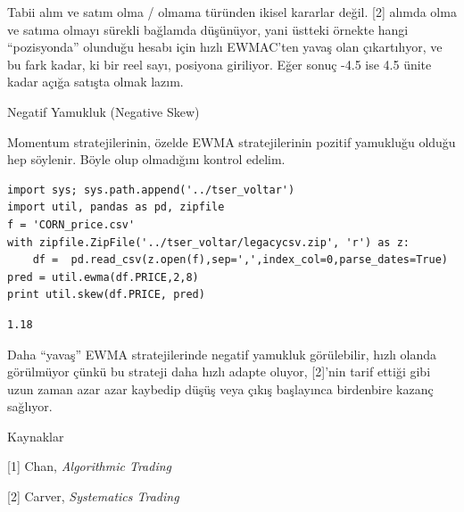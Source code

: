 \documentclass[12pt,fleqn]{article}\usepackage{../../common}
\begin{document}
Tabii alım ve satım olma / olmama türünden ikisel kararlar değil. [2] alımda
olma ve satıma olmayı sürekli bağlamda düşünüyor, yani üstteki örnekte hangi
``pozisyonda'' olunduğu hesabı için hızlı EWMAC'ten yavaş olan çıkartılıyor, ve
bu fark kadar, ki bir reel sayı, posiyona giriliyor. Eğer sonuç -4.5 ise 4.5
ünite kadar açığa satışta olmak lazım. 

Negatif Yamukluk (Negative Skew)

Momentum stratejilerinin, özelde EWMA stratejilerinin pozitif yamukluğu olduğu
hep söylenir. Böyle olup olmadığını kontrol edelim.

\begin{verbatim}
import sys; sys.path.append('../tser_voltar')
import util, pandas as pd, zipfile
f = 'CORN_price.csv'
with zipfile.ZipFile('../tser_voltar/legacycsv.zip', 'r') as z:
    df =  pd.read_csv(z.open(f),sep=',',index_col=0,parse_dates=True)
pred = util.ewma(df.PRICE,2,8)
print util.skew(df.PRICE, pred)
\end{verbatim}

\begin{verbatim}
1.18
\end{verbatim}

Daha ``yavaş'' EWMA stratejilerinde negatif yamukluk görülebilir, hızlı olanda
görülmüyor çünkü bu strateji daha hızlı adapte oluyor, [2]'nin tarif ettiği gibi
uzun zaman azar azar kaybedip düşüş veya çıkış başlayınca birdenbire kazanç
sağlıyor. 

Kaynaklar

[1] Chan, {\em Algorithmic Trading}

[2] Carver, {\em Systematics Trading}
\end{document}
